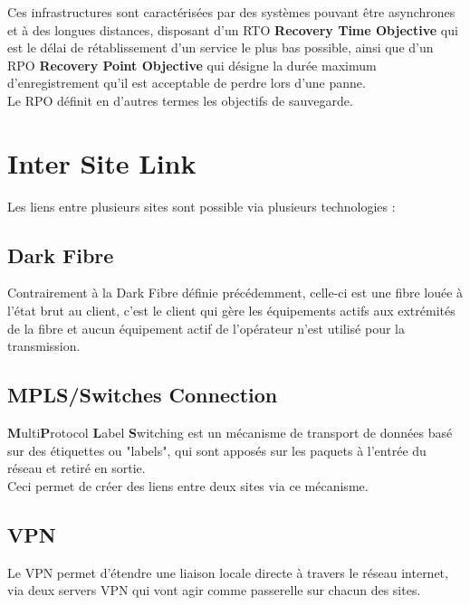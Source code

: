 \documentclass{report}
\begin{document}
		Ces infrastructures sont caractérisées par des systèmes pouvant être asynchrones et à des longues distances, disposant d'un RTO \textbf{Recovery Time Objective} qui est le délai de rétablissement d'un service le plus bas possible, ainsi que d'un RPO \textbf{Recovery Point Objective} qui désigne la durée maximum d'enregistrement qu'il est acceptable de perdre lors d'une panne.\\
		Le RPO définit en d'autres termes les objectifs de sauvegarde.\\

	\section{Inter Site Link}

		Les liens entre plusieurs sites sont possible via plusieurs technologies : \\

		\subsection{Dark Fibre}

			Contrairement à la Dark Fibre définie précédemment, celle-ci est une fibre louée à l'état brut au client, c'est le client qui gère les équipements actifs aux extrémités de la fibre et aucun équipement actif de l'opérateur n'est utilisé pour la transmission.\\

		\subsection{MPLS/Switches Connection}

			\textbf{M}ulti\textbf{P}rotocol \textbf{L}abel \textbf{S}witching est un mécanisme de transport de données basé sur des étiquettes ou "labels", qui sont apposés sur les paquets à l'entrée du réseau et retiré en sortie.\\
			Ceci permet de créer des liens entre deux sites via ce mécanisme.\\

		\subsection{VPN}

			Le VPN permet d'étendre une liaison locale directe à travers le réseau internet, via deux servers VPN qui vont agir comme passerelle sur chacun des sites.\\
\end{document}
